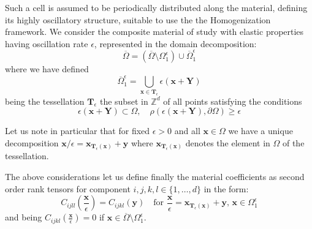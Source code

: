 Such a cell is assumed to be periodically distributed along the material, defining its highly oscillatory structure, suitable to use the the Homogenization framework. We consider the composite material of study with elastic properties having oscillation rate $\epsilon$, represented in the domain decomposition:
\begin{equation*}
	\overline{\Omega} = (\overline{\Omega}\setminus \Omega_1^{\epsilon}) \cup \overline{\Omega}^{\epsilon}_1
\end{equation*}
where we have defined
\begin{equation*}
    \overline{\Omega}^{\epsilon}_1 = \bigcup_{\mathbf{x} \in \mathbf{T}_{\epsilon}} \epsilon ( \mathbf{x} + \mathbf{Y} )
\end{equation*}
being the tessellation $\mathbf{T}_{\epsilon}$ the subset in $\mathbb{Z}^d$ of all points satisfying the conditions
\begin{equation*}
    \epsilon (\mathbf{x} + \mathbf{Y}) \subset \Omega, \quad \rho(\epsilon(\mathbf{x}+\mathbf{Y}), \partial \Omega) \geq \epsilon
\end{equation*}

Let us note in particular that for fixed $\epsilon >0$ and all $\mathbf{x} \in \Omega$ we have a unique decomposition $\mathbf{x}/\epsilon = \mathbf{x}_{\mathbf{T}_{\epsilon}(\mathbf{x})} + \mathbf{y}$ where $\mathbf{x}_{\mathbf{T}_{\epsilon}(\mathbf{x})}$ denotes the element in $\Omega$ of the tessellation.

The above considerations let us define finally the material coefficients as second order rank tensors for component $i,j,k,l \in \{1,\dots, d\}$ in the form:
\begin{equation*}
    C_{ijll}(\frac{\mathbf{x}}{\epsilon}) = C_{ijkl}(\mathbf{y}) \quad \text{for } \frac{\mathbf{x}}{\epsilon} = \mathbf{x}_{\mathbf{T}_{\epsilon}(\mathbf{x})} + \mathbf{y}, \, \mathbf{x} \in \Omega_1^{\epsilon}
\end{equation*}
and being $C_{ijkl}(\frac{\mathbf{x}}{\epsilon}) = 0$ if $\mathbf{x} \in \overline{\Omega} \setminus \Omega_1^{\epsilon}$.

